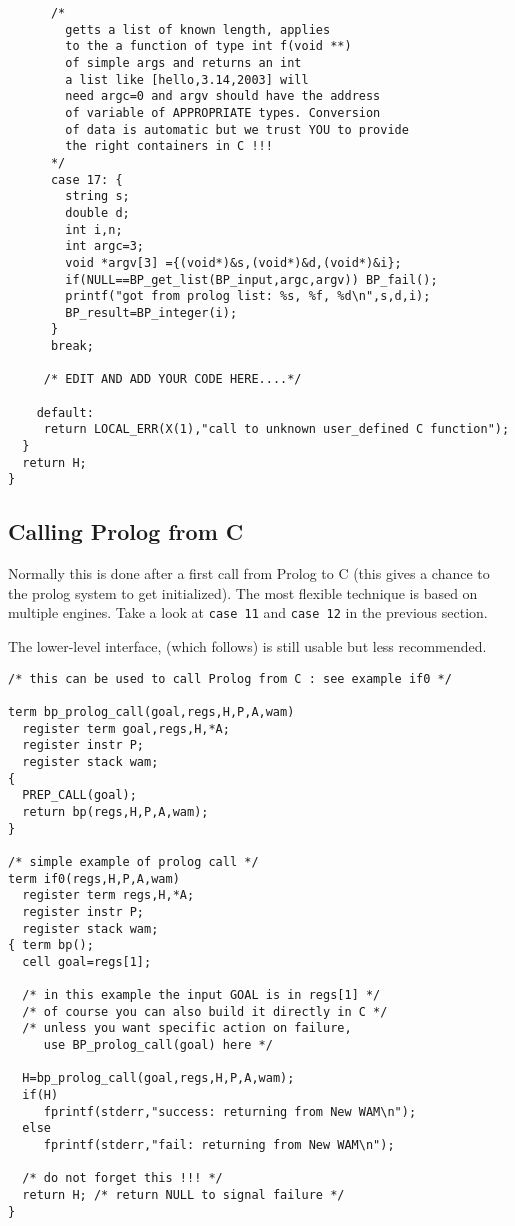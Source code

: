\documentclass{article}
\begin{document}
{\begin{verbatim}
      /*
        getts a list of known length, applies
        to the a function of type int f(void **) 
        of simple args and returns an int
        a list like [hello,3.14,2003] will
        need argc=0 and argv should have the address
        of variable of APPROPRIATE types. Conversion
        of data is automatic but we trust YOU to provide
        the right containers in C !!!
      */
      case 17: {
        string s;
        double d;
        int i,n;
        int argc=3;
        void *argv[3] ={(void*)&s,(void*)&d,(void*)&i};
        if(NULL==BP_get_list(BP_input,argc,argv)) BP_fail();
        printf("got from prolog list: %s, %f, %d\n",s,d,i);
        BP_result=BP_integer(i);
      } 
      break;
      
     /* EDIT AND ADD YOUR CODE HERE....*/

    default:
     return LOCAL_ERR(X(1),"call to unknown user_defined C function");
  }
  return H; 
}

\end{verbatim}
}

\subsection{Calling Prolog from C}

Normally this is done after a first call from Prolog to C
(this gives a chance to the prolog system to get initialized).
The most flexible technique is based on multiple engines. Take a look
at {\tt case 11} and {\tt case 12} in the previous section.

The lower-level interface, (which follows) is still usable
but less recommended.

{\small
\begin{verbatim}
/* this can be used to call Prolog from C : see example if0 */

term bp_prolog_call(goal,regs,H,P,A,wam)
  register term goal,regs,H,*A;
  register instr P;
  register stack wam;
{
  PREP_CALL(goal);
  return bp(regs,H,P,A,wam);
}

/* simple example of prolog call */
term if0(regs,H,P,A,wam)
  register term regs,H,*A;
  register instr P;
  register stack wam;
{ term bp();
  cell goal=regs[1];

  /* in this example the input GOAL is in regs[1] */
  /* of course you can also build it directly in C */
  /* unless you want specific action on failure,
     use BP_prolog_call(goal) here */

  H=bp_prolog_call(goal,regs,H,P,A,wam); 
  if(H) 
     fprintf(stderr,"success: returning from New WAM\n");
  else 
     fprintf(stderr,"fail: returning from New WAM\n");

  /* do not forget this !!! */
  return H; /* return NULL to signal failure */
}
\end{verbatim}
}
\end{document}
